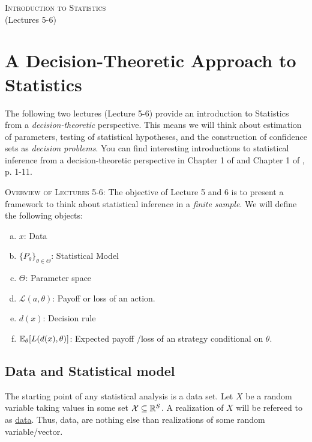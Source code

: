 \documentclass[11pt]{article} %
\begin{document}
\onehalfspace

\vspace*{\fill}
\begingroup
\centering

\Large {\scshape Introduction to Statistics}\\

(Lectures 5-6)

\endgroup
\vspace*{\fill}

\newpage

\section{A Decision-Theoretic Approach to Statistics}
The following two lectures (Lecture 5-6) provide an introduction to Statistics from a \emph{decision-theoretic} perspective. This means we will think about estimation of parameters, testing of statistical hypotheses, and the construction of confidence sets as \emph{decision problems}. You can find interesting introductions to  statistical inference from a decision-theoretic perspective in Chapter 1 of \cite{Lehman05} and Chapter 1 of \cite{Ferguson67}, p. 1-11.

{\scshape Overview of Lectures 5-6:} The objective of Lecture 5 and 6 is to present a framework to think about statistical inference in a \emph{finite sample}.  We will define the following objects:


\begin{enumerate}[a)]
\item $x$: Data
\item $\{P_{\theta}\}_{\theta \in \Theta}$: Statistical Model
\item $\Theta$: Parameter space
\item $\mathcal{L}(a,\theta)$: Payoff or loss  of an action.
\item $d(x)$: Decision rule
\item $\mathbb{E}_{\theta}[L(d(x),\theta)]$: Expected payoff /loss of an strategy conditional on $\theta$.
\end{enumerate}

\subsection{Data and Statistical model}

The starting point of any statistical analysis is a data set. Let $X$ be a random variable taking values in some set $\mathcal{X} \subseteq \mathbb{R}^{S}$. A realization of $X$ will be refereed to as \underline{data}. Thus, data, are nothing else than realizations of some random variable/vector. \\
\end{document}
